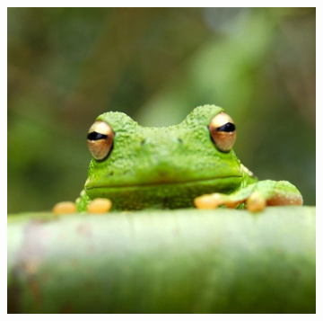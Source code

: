 \documentclass[twocolumn, 9pt]{extarticle}
\begin{document}
\begin{figure}[ht]
\begin{subfigure}[b]{0.1\linewidth}
    \caption{}
    \label{subfig:frog3h}
\end{subfigure}
\begin{subfigure}[b]{0.1\linewidth}
    \includegraphics[width=\linewidth]{frog.jpg}
    \caption{}
    \label{subfig:frog3i}
\end{subfigure}


\end{figure}
\end{document}
